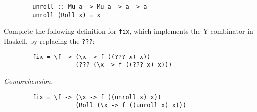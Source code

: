 \begin{questions}
\begin{parts}
\begin{verbatim}
		unroll :: Mu a -> Mu a -> a -> a 
		unroll (Roll x) = x
		\end{verbatim}
		Complete the following definition for \texttt{fix}, which implements the Y-combinator in Haskell, by replacing the \texttt{???}: 
		\begin{verbatim}
		fix = \f -> (\x -> f ((??? x) x)) 
		            (??? (\x -> f ((??? x) x)))
		\end{verbatim}
		\droppoints 
		\begin{solution} \emph{Comprehension.}
		\begin{verbatim}
        fix = \f -> (\x -> f ((unroll x) x)) 
                    (Roll (\x -> f ((unroll x) x)))
		\end{verbatim}
		\end{solution}
	\end{parts}
	 
	\end{questions}

